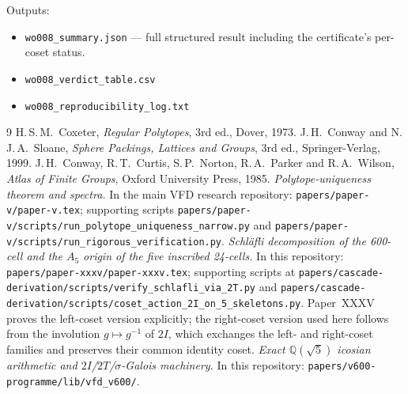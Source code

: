 \documentclass[11pt]{article}
\newcommand{\twoI}{2I}
\newcommand{\twoT}{2T}
\theoremstyle{plain}
\theoremstyle{definition}
\begin{document}
Outputs:
\begin{itemize}
  \item \texttt{wo008\_summary.json} — full structured result
        including the certificate's per-coset status.
  \item \texttt{wo008\_verdict\_table.csv}
  \item \texttt{wo008\_reproducibility\_log.txt}
\end{itemize}

\begin{thebibliography}{9}
H.\,S.\,M.~Coxeter, \emph{Regular Polytopes}, 3rd ed., Dover, 1973.
J.\,H.~Conway and N.\,J.\,A.~Sloane, \emph{Sphere Packings, Lattices and
Groups}, 3rd ed., Springer-Verlag, 1999.
J.\,H.~Conway, R.\,T.~Curtis, S.\,P.~Norton, R.\,A.~Parker and R.\,A.~Wilson,
\emph{Atlas of Finite Groups}, Oxford University Press, 1985.
\emph{Polytope-uniqueness theorem and spectra.}  In the main VFD
research repository:
\texttt{papers/paper-v/paper-v.tex}; supporting scripts
\texttt{papers/paper-v/scripts/run\_polytope\_uniqueness\_narrow.py}
and \texttt{papers/paper-v/scripts/run\_rigorous\_verification.py}.
\emph{Schl\"afli decomposition of the 600-cell and the $A_5$ origin of
the five inscribed 24-cells.} In this repository:
\texttt{papers/paper-xxxv/paper-xxxv.tex}; supporting scripts at
\texttt{papers/cascade-derivation/scripts/verify\_schlafli\_via\_2T.py}
and
\texttt{papers/cascade-derivation/scripts/coset\_action\_2I\_on\_5\_skeletons.py}.
Paper~XXXV proves the left-coset version explicitly; the right-coset
version used here follows from the involution $g\mapsto g^{-1}$ of
$\twoI$, which exchanges the left- and right-coset families and
preserves their common identity coset.
\emph{Exact $\mathbb{Q}(\sqrt5)$ icosian arithmetic and
$\twoI$/$\twoT$/$\sigma$-Galois machinery.}  In this repository:
\texttt{papers/v600-programme/lib/vfd\_v600/}.
\end{thebibliography}
\end{document}
